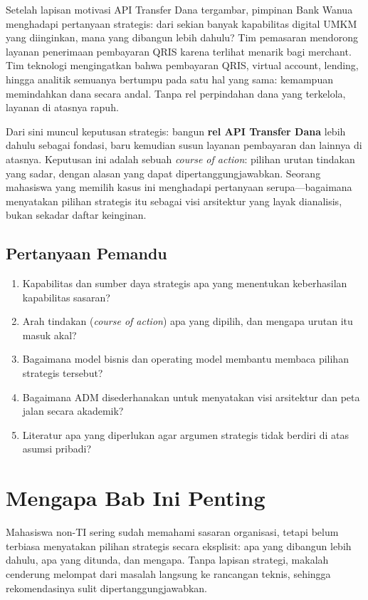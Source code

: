 Setelah lapisan motivasi API Transfer Dana tergambar, pimpinan Bank Wanua
menghadapi pertanyaan strategis: dari sekian banyak kapabilitas digital UMKM
yang diinginkan, mana yang dibangun lebih dahulu? Tim pemasaran mendorong
layanan penerimaan pembayaran QRIS karena terlihat menarik bagi merchant. Tim
teknologi mengingatkan bahwa pembayaran QRIS, virtual account, lending, hingga
analitik semuanya bertumpu pada satu hal yang sama: kemampuan memindahkan dana
secara andal. Tanpa rel perpindahan dana yang terkelola, layanan di atasnya
rapuh.

Dari sini muncul keputusan strategis: bangun \textbf{rel API Transfer Dana}
lebih dahulu sebagai fondasi, baru kemudian susun layanan pembayaran dan
lainnya di atasnya. Keputusan ini adalah sebuah \emph{course of action}: pilihan
urutan tindakan yang sadar, dengan alasan yang dapat dipertanggungjawabkan.
Seorang mahasiswa yang memilih kasus ini menghadapi pertanyaan serupa---bagaimana
menyatakan pilihan strategis itu sebagai visi arsitektur yang layak dianalisis,
bukan sekadar daftar keinginan.

\subsection*{Pertanyaan Pemandu}

\begin{enumerate}
  \item Kapabilitas dan sumber daya strategis apa yang menentukan keberhasilan
        kapabilitas sasaran?
  \item Arah tindakan (\emph{course of action}) apa yang dipilih, dan mengapa
        urutan itu masuk akal?
  \item Bagaimana model bisnis dan operating model membantu membaca pilihan
        strategis tersebut?
  \item Bagaimana ADM disederhanakan untuk menyatakan visi arsitektur dan peta
        jalan secara akademik?
  \item Literatur apa yang diperlukan agar argumen strategis tidak berdiri di
        atas asumsi pribadi?
\end{enumerate}

\section{Mengapa Bab Ini Penting}

Mahasiswa non-TI sering sudah memahami sasaran organisasi, tetapi belum terbiasa
menyatakan pilihan strategis secara eksplisit: apa yang dibangun lebih dahulu,
apa yang ditunda, dan mengapa. Tanpa lapisan strategi, makalah cenderung
melompat dari masalah langsung ke rancangan teknis, sehingga rekomendasinya
sulit dipertanggungjawabkan.

